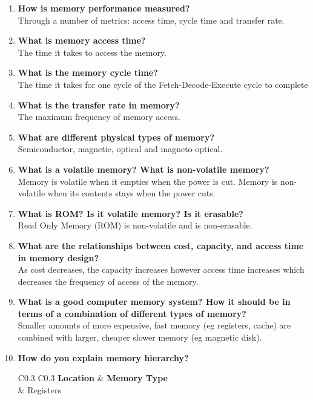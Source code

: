 \begin{enumerate}
    \item \textbf{How is memory performance measured?}\\
    Through a number of metrics: access time, cycle time and transfer rate.
    \item \textbf{What is memory access time?}\\
    The time it takes to access the memory.
    \item \textbf{What is the memory cycle time?}\\
    The time it takes for one cycle of the Fetch-Decode-Execute cycle to complete
    \item \textbf{What is the transfer rate in memory?}\\
    The maximum frequency of memory access.
    \item \textbf{What are different physical types of memory?}\\
    Semiconductor, magnetic, optical and magneto-optical.
    \item \textbf{What is a volatile memory? What is non-volatile memory?}\\
    Memory is volatile when it empties when the power is cut. Memory is non-volatile when its contents stays when the power cuts. 
    \item \textbf{What is ROM? Is it volatile memory? Is it erasable?}\\
    Read Only Memory (ROM) is non-volatile and is non-erasable.
    \item \textbf{What are the relationships between cost, capacity, and access time in memory design?}\\
    As cost decreases, the capacity increases however access time increases which decreases the frequency of access of the memory.
    \item \textbf{What is a good computer memory system? How it should be in terms of a combination of different types of memory?}\\
    Smaller amounts of more expensive, fast memory (eg registers, cache) are combined with larger, cheaper slower memory (eg magnetic disk).
    \item \textbf{How do you explain memory hierarchy?}
    \begin{table}[H]
        \centering
        \begin{tabular}{C{0.3\textwidth} C{0.3\textwidth}}
            \textbf{Location} & \textbf{Memory Type}\\
            \hline
            \hline
             & Registers\\

\end{tabular}
\end{table}
\end{enumerate}
